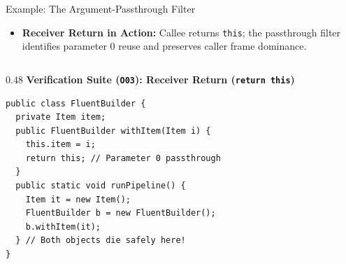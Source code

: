 \documentclass[11pt]{beamer}
\begin{document}
\begingroup
{}
\begin{frame}[fragile]{Example: The Argument-Passthrough Filter}
  \vspace{-0.3em}
  \begin{itemize}\setlength{\itemsep}{0pt}\setlength{\parskip}{0pt}
    \item \textbf{Receiver Return in Action:} Callee returns \texttt{this}; the passthrough filter identifies parameter 0 reuse and preserves caller frame dominance.
  \end{itemize}
  \vspace{-0.4em}

  \begin{columns}[T,onlytextwidth]
    \begin{column}{0.48\textwidth}
      {\scriptsize\bfseries\color{darkblue} Verification Suite (\texttt{O03}): Receiver Return (\texttt{return this})}\\[2pt]
\begin{lstlisting}[style=javacodetiny, basicstyle=\fontsize{6.2pt}{7.6pt}\selectfont\ttfamily]
public class FluentBuilder {
  private Item item;
  public FluentBuilder withItem(Item i) {
    this.item = i;
    return this; // Parameter 0 passthrough
  }
  public static void runPipeline() {
    Item it = new Item();
    FluentBuilder b = new FluentBuilder();
    b.withItem(it);
  } // Both objects die safely here!
}
\end{lstlisting}
    \end{column}


\end{columns}
\end{frame}
\end{document}
